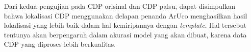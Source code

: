 Dari kedua pengujian pada CDP orisinal dan CDP palsu, dapat disimpulkan bahwa lokalisasi CDP menggunakan delapan penanda ArUco menghasilkan hasil lokalisasi
yang lebih baik dalam hal kemiripannya dengan \emph{template}. Hal tersebut tentunya akan berpengaruh dalam akurasi model yang akan dibuat, karena data CDP
yang diproses lebih berkualitas.

